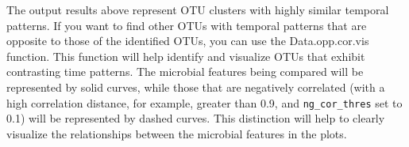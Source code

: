 \documentclass[
]{article}
\newenvironment{Shaded}{\begin{snugshade}}{\end{snugshade}}
\newcommand{\AttributeTok}[1]{\textcolor[rgb]{0.13,0.29,0.53}{#1}}
\newcommand{\CommentTok}[1]{\textcolor[rgb]{0.56,0.35,0.01}{\textit{#1}}}
\newcommand{\ConstantTok}[1]{\textcolor[rgb]{0.56,0.35,0.01}{#1}}
\newcommand{\DecValTok}[1]{\textcolor[rgb]{0.00,0.00,0.81}{#1}}
\newcommand{\FloatTok}[1]{\textcolor[rgb]{0.00,0.00,0.81}{#1}}
\newcommand{\FunctionTok}[1]{\textcolor[rgb]{0.13,0.29,0.53}{\textbf{#1}}}
\newcommand{\NormalTok}[1]{#1}
\newcommand{\OtherTok}[1]{\textcolor[rgb]{0.56,0.35,0.01}{#1}}
\newcommand{\SpecialCharTok}[1]{\textcolor[rgb]{0.81,0.36,0.00}{\textbf{#1}}}
\newcommand{\StringTok}[1]{\textcolor[rgb]{0.31,0.60,0.02}{#1}}
\begin{document}
\begin{Shaded}
\end{Shaded}

The output results above represent OTU clusters with highly similar
temporal patterns. If you want to find other OTUs with temporal patterns
that are opposite to those of the identified OTUs, you can use the
Data.opp.cor.vis function. This function will help identify and
visualize OTUs that exhibit contrasting time patterns. The microbial
features being compared will be represented by solid curves, while those
that are negatively correlated (with a high correlation distance, for
example, greater than 0.9, and \texttt{ng\_cor\_thres} set to 0.1) will
be represented by dashed curves. This distinction will help to clearly
visualize the relationships between the microbial features in the plots.
\end{document}
